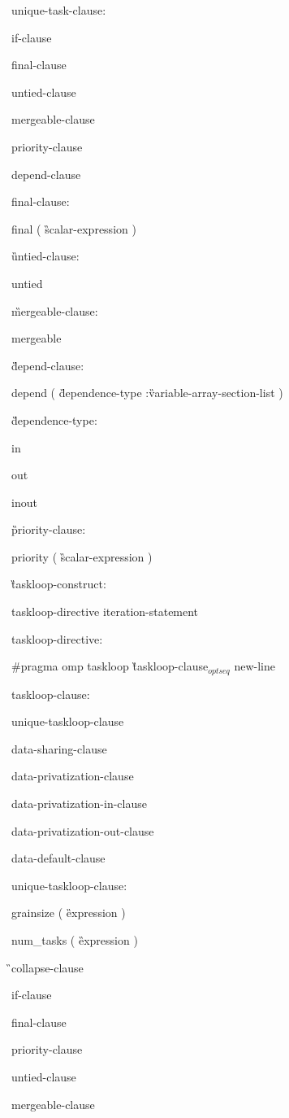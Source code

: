 {unique-task-clause:

\I if-clause

\I final-clause

\I untied-clause

\I mergeable-clause 

\I priority-clause

\I depend-clause

final-clause:

\C\I final ( \G scalar-expression \C )

\G untied-clause:

\C\I untied

\G mergeable-clause:

\C\I mergeable

\G depend-clause:

\C\I depend ( \G dependence-type \C :\G variable-array-section-list \C )

\G dependence-type:

\C\I in

\I out

\I inout

\G priority-clause:

\C\I priority ( \G scalar-expression \C )

\G taskloop-construct:

\I taskloop-directive iteration-statement

taskloop-directive:

\C\I \#pragma omp taskloop \G taskloop-clause$_{optseq}$ new-line

taskloop-clause:

\I unique-taskloop-clause 

\I data-sharing-clause

\I data-privatization-clause

\I data-privatization-in-clause

\I data-privatization-out-clause

\I data-default-clause

unique-taskloop-clause:

\C\I grainsize ( \G expression \C )

\I num\_tasks ( \G expression \C )

\G\I collapse-clause

\I if-clause

\I final-clause

\I priority-clause

\I untied-clause

\I mergeable-clause

}
